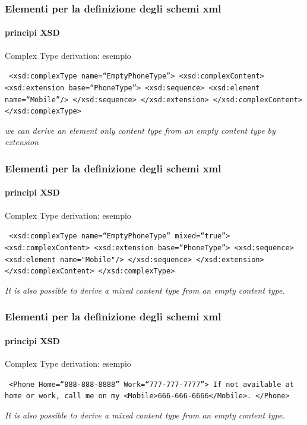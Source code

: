 \begin{frame}
	\frametitle{Elementi per la definizione degli schemi xml}
	\framesubtitle{principi XSD}
	\addtocounter{nframe}{1}

	\begin{block}{Complex Type derivation: esempio}

		\texttt{
			<xsd:complexType name=``EmptyPhoneType''>
			<xsd:complexContent>
			<xsd:extension base=``PhoneType''>
			<xsd:sequence>
			<xsd:element name=``Mobile''/>
			</xsd:sequence>
			</xsd:extension>
			</xsd:complexContent>
			</xsd:complexType>
		}
	\end{block}
	\textit{we can derive an element only content type from an empty content type by extension}
\end{frame}


\begin{frame}
	\frametitle{Elementi per la definizione degli schemi xml}
	\framesubtitle{principi XSD}
	\addtocounter{nframe}{1}

	\begin{block}{Complex Type derivation: esempio}

		\texttt{
			<xsd:complexType name=``EmptyPhoneType'' mixed=``true''>
			<xsd:complexContent>
			<xsd:extension base=``PhoneType''>
			<xsd:sequence>
			<xsd:element name="Mobile"/>
			</xsd:sequence>
			</xsd:extension>
			</xsd:complexContent>
			</xsd:complexType>
		}
	\end{block}
	\textit{It is also possible to derive a mixed content type from an empty content type.}
\end{frame}

\begin{frame}
	\frametitle{Elementi per la definizione degli schemi xml}
	\framesubtitle{principi XSD}
	\addtocounter{nframe}{1}

	\begin{block}{Complex Type derivation: esempio}

		\texttt{
			<Phone Home=``888-888-8888'' Work=``777-777-7777''>
			If not available at home or work, call me on my
			<Mobile>666-666-6666</Mobile>.
			</Phone>
		}
	\end{block}
	\textit{It is also possible to derive a mixed content type from an empty content type.}
\end{frame}




